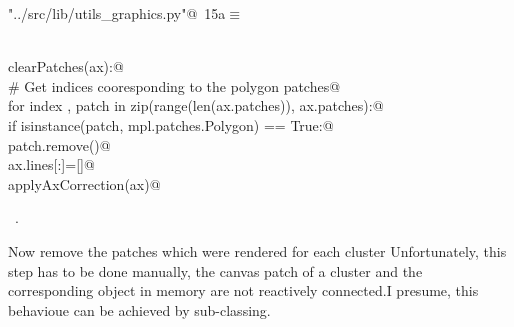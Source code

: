 \documentclass[11.5pt]{report}
\begin{document}
\begin{flushleft} \small\label{scrap5}\raggedright\small
{} \verb@"../src/lib/utils_graphics.py"@\nobreak\ {\footnotesize {15a}}$\equiv$
\vspace{-1ex}
\begin{list}{}{} \item
\mbox{}\verb@@\\
\mbox{}\verb@def clearPatches(ax):@\\
\mbox{}\verb@    # Get indices cooresponding to the polygon patches@\\
\mbox{}\verb@    for index , patch in zip(range(len(ax.patches)), ax.patches):@\\
\mbox{}\verb@        if isinstance(patch, mpl.patches.Polygon) == True:@\\
\mbox{}\verb@            patch.remove()@\\
\mbox{}\verb@    ax.lines[:]=[]@\\
\mbox{}\verb@    applyAxCorrection(ax)@\\
\mbox{}\verb@@{\NWsep}
\end{list}
\vspace{-1.5ex}
\footnotesize
\begin{list}{}{\setlength{\itemsep}{-\parsep}\setlength{\itemindent}{-\leftmargin}}
\item \NWtxtFileDefBy\ .

\item{}
\end{list}
\vspace{4ex}
\end{flushleft}

\vspace{-0.8cm}
\newchunk Now remove the patches which were rendered for each cluster
    Unfortunately, this step has to be done manually, the canvas patch
    of a cluster and the corresponding object in memory are not reactively
    connected.I presume, this behavioue can be achieved by sub-classing.
\end{document}
